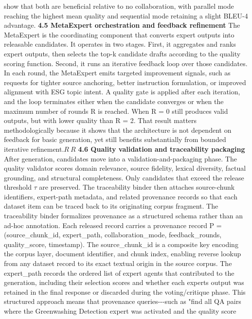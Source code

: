 \documentclass[9pt,twocolumn]{extarticle}
\begin{document}
show that both are beneficial relative to no collaboration, with
parallel mode reaching the highest mean quality and sequential mode
retaining a slight BLEU-4 advantage.
\textbf{4.5 MetaExpert orchestration and feedback refinement}
The MetaExpert is the coordinating component that converts expert
outputs into releasable candidates. It operates in two stages. First, it
aggregates and ranks expert outputs, then selects the top-k candidate
drafts according to the quality scoring function. Second, it runs an
iterative feedback loop over those candidates. In each round, the
MetaExpert emits targeted improvement signals, such as requests for
tighter source anchoring, better instruction formulation, or improved
alignment with ESG topic intent. A quality gate is applied after each
iteration, and the loop terminates either when the candidate converges
or when the maximum number of rounds R is reached.
When R = 0 still produces valid outputs, but with lower quality than R =
2. That result matters methodologically because it shows that the
architecture is not dependent on feedback for basic generation, yet
still benefits substantially from bounded iterative
refinement.\(R\ \)\(R\)
\textbf{4.6 Quality validation and traceability packaging}
After generation, candidates move into a validation-and-packaging phase.
The quality validator scores domain relevance, source fidelity, lexical
diversity, factual grounding, and structural completeness. Only
candidates that exceed the release threshold $\tau$ are preserved. The
traceability binder then attaches source-chunk identifiers, expert-path
metadata, and related provenance records so that each dataset item can
be traced back to its originating corpus fragment.
The traceability binder formalizes provenance as a structured schema
rather than an ad-hoc annotation. Each released record carries a
provenance record P = (source\_chunk\_id, expert\_path,
collaboration\_mode, feedback\_rounds, quality\_score, timestamp). The
source\_chunk\_id is a composite key encoding the corpus layer, document
identifier, and chunk index, enabling reverse lookup from any dataset
record to its exact textual origin in the source corpus. The
expert\_path records the ordered list of expert agents that contributed
to the generation, including their selection scores and whether each
expert\textquotesingle s output was retained in the final response or
discarded during the voting/critique phase. This structured approach
means that provenance queries-\/-\/-such as "find all QA pairs where the
Greenwashing Detection expert was activated and the quality score
\end{document}
